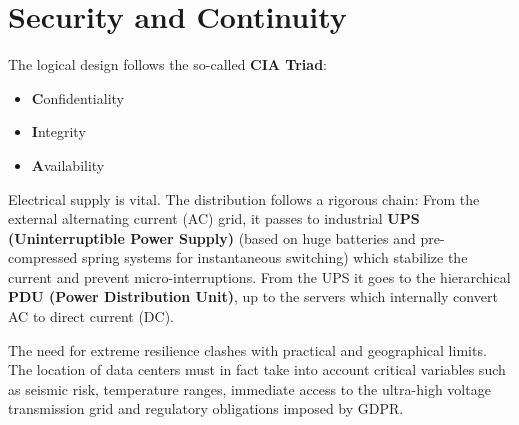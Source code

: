 \section{Security and Continuity}
The logical design follows the so-called \textbf{CIA Triad}:
\begin{itemize}
    \item \textbf{C}onfidentiality
    \item \textbf{I}ntegrity
    \item \textbf{A}vailability
\end{itemize}

Electrical supply is vital. The distribution follows a rigorous chain:
From the external alternating current (AC) grid, it passes to industrial \textbf{UPS (Uninterruptible Power Supply)} (based on huge batteries and pre-compressed spring systems for instantaneous switching) which stabilize the current and prevent micro-interruptions. From the UPS it goes to the hierarchical \textbf{PDU (Power Distribution Unit)}, up to the servers which internally convert AC to direct current (DC).

The need for extreme resilience clashes with practical and geographical limits. The location of data centers must in fact take into account critical variables such as seismic risk, temperature ranges, immediate access to the ultra-high voltage transmission grid and regulatory obligations imposed by GDPR.

